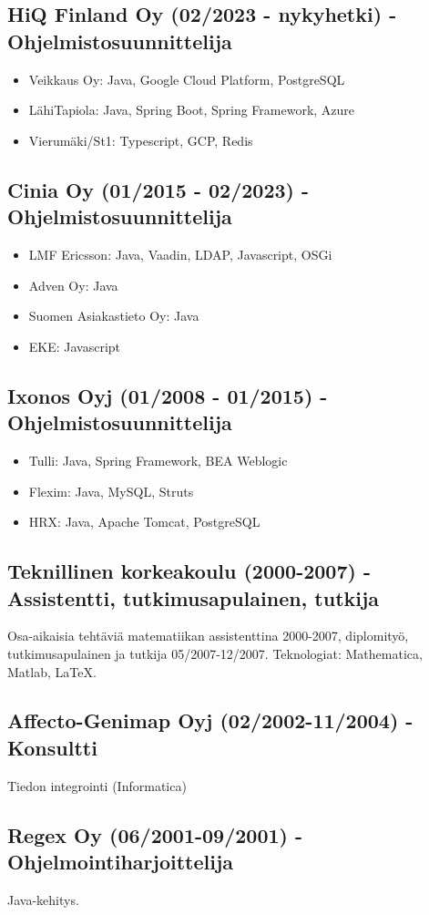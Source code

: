 \documentclass[a4paper,12pt]{article}
\begin{document}
\subsection*{HiQ Finland Oy (02/2023 - nykyhetki) - Ohjelmistosuunnittelija}
\begin{itemize}
\item{Veikkaus Oy: Java, Google Cloud Platform, PostgreSQL}
\item{LähiTapiola: Java, Spring Boot, Spring Framework, Azure}
\item{Vierumäki/St1: Typescript, GCP, Redis}
\end{itemize}
\subsection*{Cinia Oy (01/2015 - 02/2023) - Ohjelmistosuunnittelija}
\begin{itemize}
\item{LMF Ericsson: Java, Vaadin, LDAP, Javascript, OSGi}
\item{Adven Oy: Java}
\item{Suomen Asiakastieto Oy: Java}
\item{EKE: Javascript}
\end{itemize}
\subsection*{Ixonos Oyj (01/2008 - 01/2015) - Ohjelmistosuunnittelija}
\begin{itemize}
\item{Tulli: Java, Spring Framework, BEA Weblogic}
\item{Flexim: Java, MySQL, Struts}
\item{HRX: Java, Apache Tomcat, PostgreSQL}
\end{itemize}
\subsection*{Teknillinen korkeakoulu (2000-2007) - Assistentti, tutkimusapulainen, tutkija}
Osa-aikaisia tehtäviä matematiikan assistenttina 2000-2007, diplomityö, tutkimusapulainen ja tutkija 05/2007-12/2007. Teknologiat: Mathematica, Matlab, LaTeX.
\subsection*{Affecto-Genimap Oyj (02/2002-11/2004) - Konsultti}
Tiedon integrointi (Informatica)
\subsection*{Regex Oy (06/2001-09/2001) - Ohjelmointiharjoittelija}
Java-kehitys.
\end{document}
